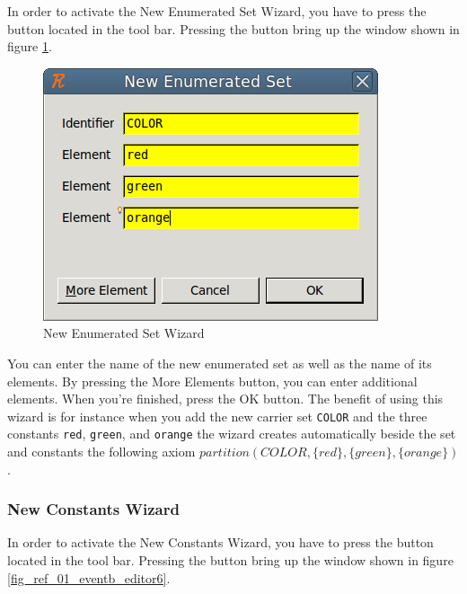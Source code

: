 In order to activate the \textsf{New Enumerated Set Wizard}, you have to press the  button located in the tool bar. Pressing the button bring up the window shown in figure \ref{fig_ref_01_eventb_editor5}.

\begin{figure}[!h]
\begin{center}
	\includegraphics{img/reference/ref_01_eventb_editor5.png}
	\caption{New Enumerated Set Wizard}
	\label{fig_ref_01_eventb_editor5}
\end{center}
\end{figure}

You can enter the name of the new enumerated set as well as the name of its elements. By pressing the \textsf{More Elements} button, you can enter additional elements. When you’re finished, press the \textsf{OK} button. The benefit of using this wizard is for instance when you add the new carrier set \texttt{COLOR} and the three constants \texttt{red}, \texttt{green}, and \texttt{orange} the wizard creates automatically beside the set and constants the following axiom $partition(COLOR , \{red\}, \{green\}, \{orange\})$.

\subsubsection{New Constants Wizard}

In order to activate the \textsf{New Constants Wizard}, you have to press the  button located in the tool bar. Pressing the button bring up the window shown in figure \ref{fig_ref_01_eventb_editor6}.


